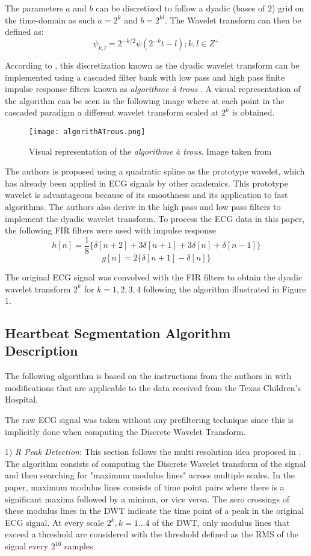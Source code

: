 \documentclass[conference,compsoc]{IEEEtran}
\begin{document}
The parameters $a$ and $b$ can be discretized to follow a dyadic (bases of $2$) grid on the time-domain as such $a = 2^k$ and $b = 2^{kl}$. The Wavelet transform can then be defined as: \cite{1275572}
$$\psi_{k,l} = 2^{-k/2}\psi(2^{-k}t-l); k, l \in Z ^+$$ 

According to \cite{45554}, this discretization known as the dyadic wavelet transform can be implemented using a cascaded filter bank with low pass and high pass finite impulse response filters known as \textit{algorithme à trous} \cite{488697}. A visual representation of the algorithm can be seen in the following image where at each point in the cascaded paradigm a different wavelet transform scaled at $2^k$ is obtained.
\begin{figure}[h]
\centering
\texttt{[image: algorithATrous.png]}
\caption{Visual representation of the \textit{algorithme à trous}. Image taken from \cite{1275572}}
\label{fig_sim}
\end{figure}

The authors is \cite{MallatS.1992Cosf} proposed using a quadratic spline as the prototype wavelet, which has already been applied in ECG signals by other academics. This prototype wavelet is advantageous because of its smoothness and its application to fast algorithms. The authors also derive in \cite{MallatS.1992Cosf} the high pass and low pass filters to implement the dyadic wavelet transform. To process the ECG data in this paper, the following FIR filters were used with impulse response
$$h[n] = \frac{1}{8}\{\delta[n+2] + 3\delta[n+1] + 3\delta[n] + \delta[n-1]\}$$
$$g[n] = 2\{\delta[n+1] - \delta[n]\}$$

The original ECG signal was convolved with the FIR filters to obtain the dyadic wavelet transform $2^k$ for $k=1,2,3,4$ following the algorithm illustrated in Figure 1.

\subsection{Heartbeat Segmentation Algorithm Description}
The following algorithm is based on the instructions from the authors in \cite{1275572} with modifications that are applicable to the data received from the Texas Children's Hospital. 

The raw ECG signal was taken without any prefiltering technique since this is implicitly done when computing the Discrete Wavelet Transform.

1) \textit{R Peak Detection}: This section follows the multi resolution idea proposed in \cite{LiC1995DoEc}. The algorithm consists of computing the Discrete Wavelet transform of the signal and then searching for "maximum modulus lines" across multiple scales. In the paper, maximum modulus lines consists of time point pairs where there is a significant maxima followed by a minima, or vice versa. The zero crossings of these modulus lines in the DWT indicate the time point of a peak in the original ECG signal. At every scale $2^k, k=1...4$ of the DWT, only modulus lines that exceed a threshold are considered with the threshold defined as the RMS of the signal every $2^16$ samples. 
\end{document}
